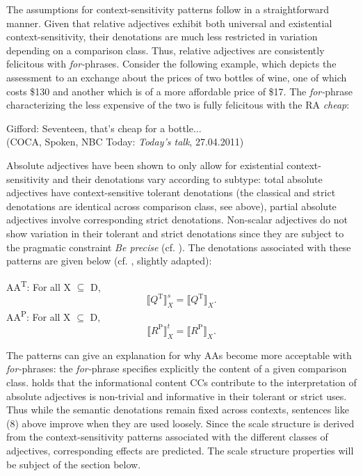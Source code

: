 \documentclass[output=paper]{langsci/langscibook}
\begin{document}
The assumptions for context-sensitivity patterns follow in a straightforward manner. Given that relative adjectives exhibit both universal and existential \linebreak context-sensitivity, their denotations are much less restricted in variation depending on a comparison class. Thus, relative adjectives are consistently felicitous with \textit{for-}phrases. Consider the following example, which depicts the assessment to an exchange about the prices of two bottles of wine, one of which costs \$130 and another which is of a more affordable price of \$17. The  \textit{for-}phrase characterizing the less expensive of the two is fully felicitous with the RA  \textit{cheap}:

\ea
	Gifford: Seventeen, that's cheap for a bottle... \\ (COCA, Spoken, NBC Today: \textit{Today's talk}, 27.04.2011)
\z

Absolute adjectives have been shown to only allow for existential context-sensitivity and their denotations vary according to subtype: total absolute adjectives have context-sensitive tolerant denotations (the classical and strict denotations are identical across comparison class, see above), partial absolute adjectives involve corresponding strict denotations. Non-scalar adjectives do not show variation in their tolerant and strict denotations since they are subject to the pragmatic constraint \textit{Be precise} (cf. \citealt[85]{Burnett2017}). The denotations associated with these patterns are given below (cf. \citealt[85]{Burnett2017}, slightly adapted):

\ea
	AA\textsuperscript{T}: For all X $\subseteq$ D, \[ \llbracket Q^{\text{T}} \rrbracket_X^s = \llbracket Q^{\text{T}}\rrbracket_{X}\text{.}\]
\z
\ea
	AA\textsuperscript{P}: For all X $\subseteq$ D, \[\llbracket R^{\text{P}}\rrbracket_X^t = \llbracket R^{\text{P}}\rrbracket_{X}\text{.}\]
\z

The patterns can give an explanation for why AAs become more acceptable with  \textit{for-}phrases: the \textit{for-}phrase specifies explicitly the content of a given comparison class. \textcite[86]{Burnett2017} holds that the informational content CCs contribute to the interpretation of absolute adjectives is non-trivial and informative in their tolerant or strict uses. Thus while the semantic denotations remain fixed across contexts, sentences like (8) above improve when they are used loosely.
Since the scale structure is derived from the context-sensitivity patterns associated with the different classes of adjectives, corresponding effects are predicted. The scale structure properties will be subject of the section below.
\end{document}
